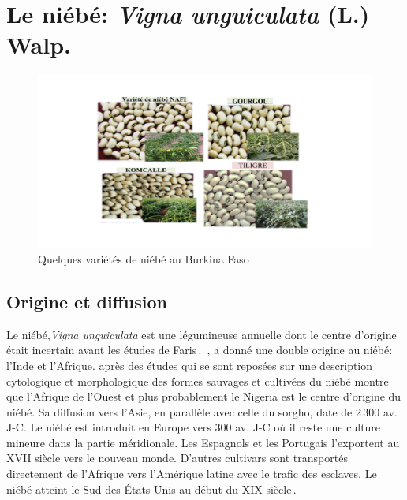 \documentclass[a4paper,11pt]{article}
\begin{document}
\section{Le niébé: \emph{Vigna unguiculata} (L.) Walp.}
\begin{figure}%
  \begin{center}
   \includegraphics[width=12cm]{images/graines_niebe}
  \end{center}
\caption{Quelques variétés de niébé au Burkina Faso}
\end{figure}

\newpage



\subsection{Origine et diffusion}

Le niébé,\emph{Vigna unguiculata} est une légumineuse annuelle dont le
centre d'origine était incertain avant les études de
Faris\,\cite{FARIS_1963,FARIS_1965}. \citeauthor{Piper_1913}\,\citeyear{Piper_1913},
a donné une double origine au niébé: l'Inde et
l'Afrique.\cite{FARIS_1963,FARIS_1965} après des études qui se sont
reposées sur une description cytologique et morphologique des formes
sauvages et cultivées du niébé montre que l'Afrique de l'Ouest et plus
probablement le Nigeria est le centre d'origine du niébé. Sa diffusion
vers l'Asie, en parallèle avec celle du sorgho, date de 2\,300
av. J-C. Le niébé est introduit en Europe vers 300 av. J-C où il reste
une culture mineure dans la partie méridionale. Les Espagnols et les
Portugais l'exportent au XVII\ieme{} siècle vers le nouveau
monde. D'autres cultivars sont transportés directement de l'Afrique
vers l'Amérique latine avec le trafic des esclaves. Le niébé atteint
le Sud des États-Unis au début du XIX\ieme{}
siècle\,\cite{Sawadogo_2009}.
\end{document}
